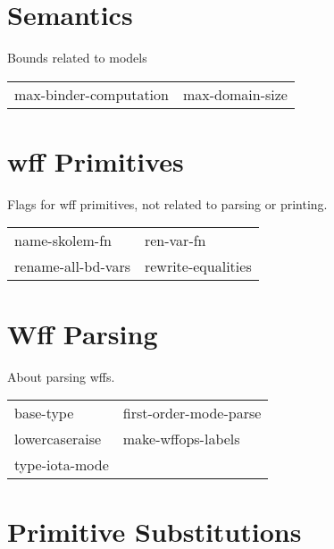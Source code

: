\section{Semantics}

\begin{description} 
\item[SEMANTIC-BOUNDS]  
Bounds related to models

\begin{tabular}{l l}
max-binder-computation&max-domain-size\\
\end{tabular}
\item
\end{description}

\section{wff Primitives}

\begin{description} 
\item[WFF-PRIMS]  
Flags for wff primitives, not related to parsing or printing.

\begin{tabular}{l l}
name-skolem-fn&ren-var-fn\\
rename-all-bd-vars&rewrite-equalities\\
\end{tabular}
\item
\end{description}

\section{Wff Parsing}

\begin{description} 
\item[PARSING]  
About parsing wffs.

\begin{tabular}{l l}
base-type&first-order-mode-parse\\
lowercaseraise&make-wffops-labels\\
type-iota-mode
\end{tabular}
\item
\end{description}

\section{Primitive Substitutions}

